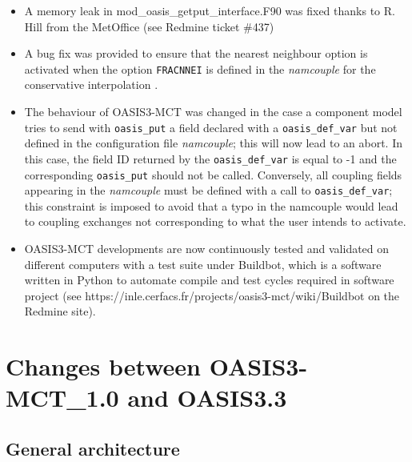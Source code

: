 \begin{itemize}
\item A memory leak in mod\_oasis\_getput\_interface.F90 was fixed
  thanks to R. Hill from the MetOffice (see Redmine ticket \#437)

\item A bug fix was provided to ensure that the nearest neighbour
  option is activated when the option {\tt FRACNNEI} is defined in the
  {\it namcouple} for the conservative interpolation .

\item The behaviour of OASIS3-MCT was changed in the case a
  component model tries to send with {\tt oasis\_put} a field declared
  with a {\tt oasis\_def\_var} but not defined in the configuration
  file {\it namcouple}; this will now lead to an abort. In this case,
  the field ID returned by the {\tt oasis\_def\_var} is equal to -1
  and the corresponding {\tt oasis\_put} should not be called.
  Conversely, all coupling fields appearing in the {\it namcouple}
  must be defined with a call to {\tt oasis\_def\_var}; this constraint
is imposed to avoid that a typo in the namcouple would lead to
coupling exchanges not corresponding to what the user intends to activate.

\item OASIS3-MCT developments are now continuously tested and
  validated on different computers with a test suite under Buildbot,
  which is a software written in Python to automate compile and test
  cycles required in software project (see
  https://inle.cerfacs.fr/projects/oasis3-mct/wiki/Buildbot on the
  Redmine site).

\end{itemize}

\section{Changes between OASIS3-MCT\_1.0 and OASIS3.3}

\subsection{General architecture}
\label{sec_changes_gen}

